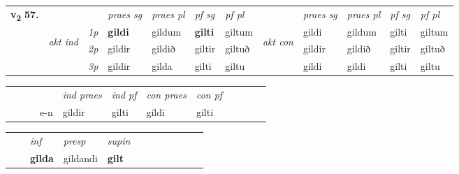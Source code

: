 \begin{tabular}{llllllllllll} \toprule
\multirow{4}{*}{{{\textbf{v{\textsubscript{2}}} \Large{\textbf{57.}}}}}  & &   &  \textit{praes sg}  & \textit{praes pl}  &\textit{ pf sg} & \textit{pf pl} &  &  \textit{praes sg}  & \textit{praes pl}  & \textit{pf sg} & \textit{pf pl } \\*
	\cmidrule{4-7} \cmidrule{9-12}
 & \multirow{3}{*}{\begin{turn}{90}\textit{akt ind}\end{turn}} & {\textit{1p}} & \textbf{gildi} & gildum    & \textbf{gilti} & giltum & \multirow{3}{*}{\begin{turn}{90}\textit{akt con}\end{turn}} &gildi & gildum & gilti & giltum\\*
& &  {\textit{2p}} &  gildir  & gildið   & giltir & giltuð & & gildir & gildið & giltir & giltuð \\*
& &  {\textit{3p}} & gildir & gilda   & gilti & giltu & & gildi & gildi& gilti & giltu  \\*
\cmidrule{4-7} \cmidrule{9-12}
\end{tabular}


\begin{tabular}{llllllllllll}
 & &  & &  \textit{ind praes} & \textit{ind pf} & \textit{con praes} & \textit{con pf} \\*
&  & & e-n & gildir & gilti & gildi & gilti \\*
\cmidrule{5-9}
\end{tabular}


\begin{tabular}{llllllllllll}
 & & \textit{inf}     & \textit{presp} & \textit{supin}       \\*
  & & \textbf{gilda}      & gildandi &  \textbf{gilt}   \\*
\cmidrule{1-12}
\end{tabular}



